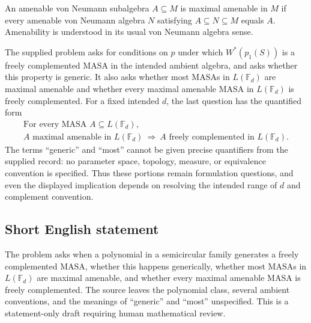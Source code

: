 \documentclass[11pt]{article}
\begin{document}
An amenable von Neumann subalgebra \(A\subseteq M\) is maximal amenable in \(M\) if every amenable von Neumann algebra \(N\) satisfying \(A\subseteq N\subseteq M\) equals \(A\). Amenability is understood in its usual von Neumann algebra sense.

The supplied problem asks for conditions on \(p\) under which \(W^*(p_1(S))\) is a freely complemented MASA in the intended ambient algebra, and asks whether this property is generic. It also asks whether most MASAs in \(L(\mathbb F_d)\) are maximal amenable and whether every maximal amenable MASA in \(L(\mathbb F_d)\) is freely complemented. For a fixed intended \(d\), the last question has the quantified form
\[
\begin{gathered}
\text{For every MASA }A\subseteq L(\mathbb F_d),\\
A\text{ maximal amenable in }L(\mathbb F_d)
\ \Longrightarrow\
A\text{ freely complemented in }L(\mathbb F_d).
\end{gathered}
\]
The terms ``generic'' and ``most'' cannot be given precise quantifiers from the supplied record: no parameter space, topology, measure, or equivalence convention is specified. Thus these portions remain formulation questions, and even the displayed implication depends on resolving the intended range of \(d\) and complement convention.
\subsection{Short English statement}
The problem asks when a polynomial in a semicircular family generates a freely complemented MASA, whether this happens generically, whether most MASAs in \(L(\mathbb F_d)\) are maximal amenable, and whether every maximal amenable MASA is freely complemented. The source leaves the polynomial class, several ambient conventions, and the meanings of ``generic'' and ``most'' unspecified. This is a statement-only draft requiring human mathematical review.
\end{document}
